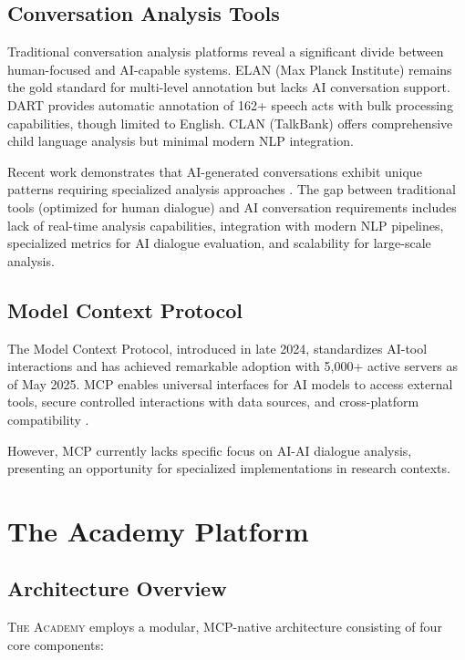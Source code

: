 \documentclass{article}
\newcommand{\theacademy}{\textsc{The Academy}}
\newcommand{\mcp}{\textsc{MCP}}
\begin{document}
\subsection{Conversation Analysis Tools}

Traditional conversation analysis platforms reveal a significant divide between human-focused and AI-capable systems. ELAN (Max Planck Institute) remains the gold standard for multi-level annotation but lacks AI conversation support. DART provides automatic annotation of 162+ speech acts with bulk processing capabilities, though limited to English. CLAN (TalkBank) offers comprehensive child language analysis but minimal modern NLP integration.

Recent work demonstrates that AI-generated conversations exhibit unique patterns requiring specialized analysis approaches \citep{yeh2024analyzing}. The gap between traditional tools (optimized for human dialogue) and AI conversation requirements includes lack of real-time analysis capabilities, integration with modern NLP pipelines, specialized metrics for AI dialogue evaluation, and scalability for large-scale analysis.

\subsection{Model Context Protocol}

The Model Context Protocol, introduced in late 2024, standardizes AI-tool interactions and has achieved remarkable adoption with 5,000+ active servers as of May 2025. \mcp{} enables universal interfaces for AI models to access external tools, secure controlled interactions with data sources, and cross-platform compatibility \citep{anthropic2024mcp}.

However, \mcp{} currently lacks specific focus on AI-AI dialogue analysis, presenting an opportunity for specialized implementations in research contexts.

\section{The Academy Platform}

\subsection{Architecture Overview}

\theacademy{} employs a modular, \mcp{}-native architecture consisting of four core components:
\end{document}
